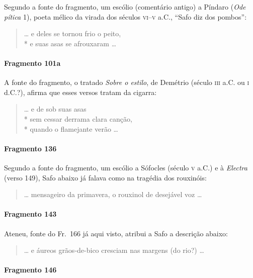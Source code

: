 {\small Segundo a fonte do fragmento, um escólio (comentário antigo) a Píndaro
(\textit{Ode pítica} 1), poeta mélico da virada dos séculos \textsc{vi}--\textsc{v} a.C.,
``Safo diz dos pombos”:}

\begin{verse}
\ldots{} e deles se tornou frio o peito,\\*
e suas asas se afrouxaram \ldots{}
\end{verse}

\paragraph{Fragmento 101a}

{\small A fonte do fragmento, o tratado \textit{Sobre o estilo}, de Demétrio (século \textsc{iii}
a.C. ou \textsc{i} d.C.?), afirma que esses versos tratam da cigarra:}

\begin{verse}
\ldots{} e de sob suas asas\\*
sem cessar derrama clara canção,\\*
quando o flamejante verão \ldots{}
\end{verse}

\paragraph{Fragmento 136}

{\small Segundo a fonte do fragmento, um escólio a Sófocles (século \textsc{v} a.C.) e à
\textit{Electra }(verso 149), Safo abaixo já falava como na tragédia dos
rouxinóis:}

\begin{verse}
\ldots{} mensageiro da primavera, o rouxinol de desejável voz \ldots{}
\end{verse}

\paragraph{Fragmento 143}

{\small Ateneu, fonte do Fr.~166 já aqui visto, atribui a Safo a descrição abaixo:}

\begin{verse}
\ldots{} e áureos grãos-de-bico cresciam nas margens (do rio?) \ldots{}
\end{verse}

\paragraph{Fragmento 146}

